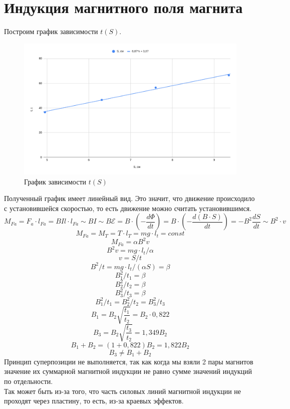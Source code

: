 \documentclass[12pt]{article}
\begin{document}
	\section{Индукция магнитного поля магнита}
	Построим график зависимости $t(S)$.
	\begin{figure}[H]
		\centering
		\includegraphics[width=\linewidth]{graph3}
		\caption{График зависимости $t(S)$}
	\end{figure}
	Полученный график имеет линейный вид. Это значит, что движение происходило с установившейся скоростью, то есть движение можно считать установившимся.\\
	$$M_{Fa} = F_a \cdot l_{Fa} = B I l \cdot l_{Fa} \sim B I \sim B \mathscr{E} = B \cdot (-\frac{d\Phi}{dt}) = B \cdot (-\frac{d(B\cdot S)}{dt})=-B^2\frac{dS}{dt} \sim B^2 \cdot v$$
	$$M_{Fa} = M_{T} = T\cdot l_T = mg\cdot l_t = const$$
	$$M_{Fa} = \alpha B^2 v$$
	$$B^2 v = mg\cdot l_t/\alpha$$
	$$v = S/t$$
	$$B^2/t = mg\cdot l_t/(\alpha S) = \beta$$
	$$B_1^2 / t_1= \beta$$
	$$B_2^2 / t_2= \beta$$
	$$B_3^2 / t_3= \beta$$
	$$B_1^2 / t_1 = B_2^2 / t_2 = B_3^2 / t_3$$
	$$B_1 = B_2\sqrt{\frac{t_1}{t_2}} = B_2\cdot0,822$$
	$$B_3 = B_2\sqrt{\frac{t_3}{t_2}} = 1,349B_2$$
	$$B_1 + B_2 = (1 + 0,822)B_2 = 1,822B_2$$
	$$B_3 \neq B_1+B_2$$
	Принцип суперпозиции не выполняется, так как когда мы взяли 2 пары магнитов значение их суммарной магнитной индукции не равно сумме значений индукций по отдельности.\\
	Так может быть из-за того, что часть силовых линий магнитной индукции не проходят через пластину, то есть, из-за краевых эффектов.
\end{document}
